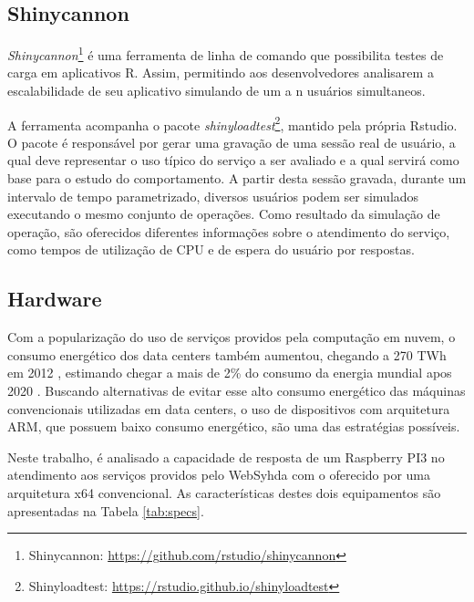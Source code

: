 \documentclass[12pt,english,brazil]{article}
\begin{document}
\subsection{Shinycannon} \label{sec:Shinycannon}

\textit{Shinycannon}\footnote{Shinycannon: \url{https://github.com/rstudio/shinycannon}} é uma ferramenta de linha de comando que possibilita testes de carga em aplicativos R. Assim, permitindo aos desenvolvedores analisarem a escalabilidade de seu aplicativo simulando de um a n usuários simultaneos.

A ferramenta acompanha o pacote \textit{shinyloadtest}\footnote{Shinyloadtest: \url{https://rstudio.github.io/shinyloadtest}}, mantido pela própria Rstudio. O pacote é responsável por gerar uma gravação de uma sessão real de usuário, a qual deve representar o uso típico do serviço a ser avaliado\cite{shinyloadtest} e a qual servirá como base para o estudo do comportamento. A partir desta sessão gravada, durante um intervalo de tempo parametrizado, diversos usuários podem ser simulados executando o mesmo conjunto de operações. Como resultado da simulação de operação, são oferecidos diferentes informações sobre o atendimento do serviço, como tempos de utilização de CPU e de espera do usuário por respostas.

\subsection{Hardware}\label{sec:Hardware}
Com a popularização do uso de serviços providos pela computação em nuvem, o consumo energético dos data centers também aumentou, chegando a 270 TWh em 2012 \cite{VanHeddeghem:2014:TWI:2657027.2657141}, estimando chegar a mais de 2\% do consumo da energia mundial apos 2020 \cite{energy}. Buscando alternativas de evitar esse alto consumo energético das máquinas convencionais utilizadas em data centers, o uso de dispositivos com arquitetura ARM, que possuem baixo consumo energético, são uma das estratégias possíveis.

Neste trabalho, é analisado a capacidade de resposta de um Raspberry PI3 no atendimento aos serviços providos pelo WebSyhda com o oferecido por uma arquitetura x64 convencional. As características destes dois equipamentos são apresentadas na Tabela \ref{tab:specs}. 
\end{document}
